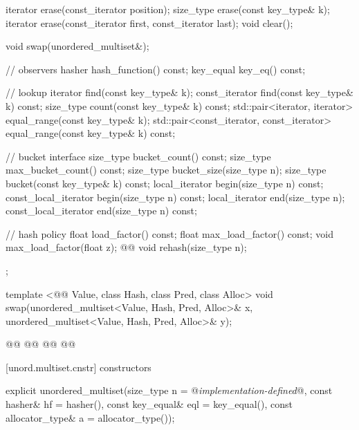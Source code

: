 \documentclass[american,twoside]{book}
\begin{document}
\begin{codeblock}
{{    iterator erase(const_iterator position);
    size_type erase(const key_type& k);
    iterator erase(const_iterator first, const_iterator last);
    void clear();

    void swap(unordered_multiset&);

    // observers
    hasher hash_function() const;
    key_equal key_eq() const;

    // lookup
    iterator       find(const key_type& k);
    const_iterator find(const key_type& k) const;
    size_type count(const key_type& k) const;
    std::pair<iterator, iterator>             equal_range(const key_type& k);
    std::pair<const_iterator, const_iterator> equal_range(const key_type& k) const;

    // bucket interface
    size_type bucket_count() const;
    size_type max_bucket_count() const;
    size_type bucket_size(size_type n);
    size_type bucket(const key_type& k) const;
    local_iterator begin(size_type n) const;
    const_local_iterator begin(size_type n) const;
    local_iterator end(size_type n);
    const_local_iterator end(size_type n) const;  

    // hash policy
    float load_factor() const;
    float max_load_factor() const;
    void max_load_factor(float z);
    @@ void rehash(size_type n);
  };

  template <@@ Value, class Hash, class Pred, class Alloc>
    void swap(unordered_multiset<Value, Hash, Pred, Alloc>& x,
              unordered_multiset<Value, Hash, Pred, Alloc>& y);

  @@
    @@
      @@
        @@
}
\end{codeblock}

[unord.multiset.cnstr]{ constructors}

%
\begin{itemdecl}
explicit unordered_multiset(size_type n = @\textit{implementation-defined}@,
                            const hasher& hf = hasher(),
                            const key_equal& eql = key_equal(),
                            const allocator_type& a = allocator_type());
\end{itemdecl}
\end{document}

